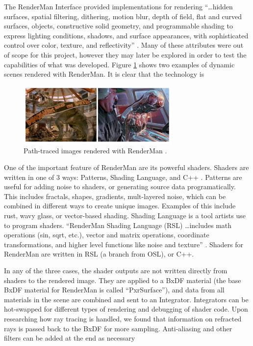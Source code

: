 \documentclass[conference]{IEEEtran}
\begin{document}
The RenderMan Interface provided implementations for rendering
``\dots hidden surfaces, spatial filtering, dithering, motion blur, depth of field,
flat and curved surfaces, objects, constructive solid geometry,
and programmable shading to express lighting conditions, shadows, and surface appearances,
with sophisticated control over color, texture, and reflectivity''
\cite{renderman_docs}.
Many of these attributes were out of scope
for this project, however they may later be explored in order to test the capabilities
of what was developed.
Figure \ref{fig:renderman} shows two examples of dynamic scenes rendered with RenderMan.
It is clear that the technology is 

\begin{figure}[htbp]
\centerline{\includegraphics[width=8cm]{renderman.png}}
\caption{Path-traced images rendered with RenderMan \cite{renderman}.}
\label{fig:renderman}
\end{figure}

One of the important feature of RenderMan are its powerful shaders.
Shaders are written in one of 3 ways: Patterns, Shading Language, and C++ \cite{shading}.
Patterns are useful for adding noise to shaders, or generating source data
programatically. This includes fractals, shapes, gradients, mult-layered noise,
which can be combined in different ways to create unique images.
Examples of this include rust, wavy glass, or vector-based shading.
Shading Language is a tool artists use to program shaders.
``RenderMan Shading Language (RSL) \dots includes math operations (sin, sqrt, etc.),
vector and matrix operations, coordinate transformations, and higher level functions like noise and texture''
\cite{renderman_docs}.
Shaders for RenderMan are written in RSL (a branch from OSL), or C++.

In any of the three cases, the shader outputs are not written directly
from shaders to the rendered image. They are applied to a BxDF material
(the base BxDF material for RenderMan is called ``PxrSurface''),
and data from all materials in the scene are combined and sent to an Integrator.
Integrators can be hot-swapped for different types of rendering and debugging of
shader code.
Upon researching how ray tracing is handled, we found that information
on refracted rays is passed
back to the BxDF for more sampling.
Anti-aliasing and other filters can be added at the end as necessary
\end{document}
